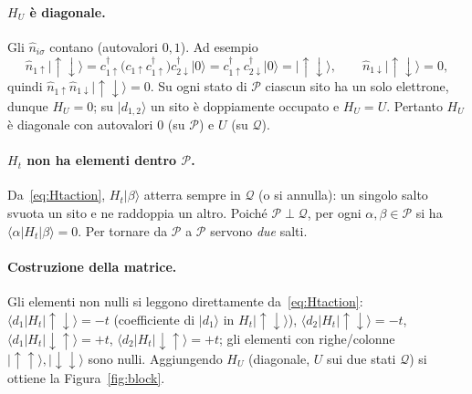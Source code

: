 \documentclass[11pt,a4paper]{article}
\newcommand{\ket}[1]{\lvert #1 \rangle}
\newcommand{\melem}[3]{\langle #1 \vert #2 \vert #3 \rangle}
\newcommand{\up}{\uparrow}
\newcommand{\dn}{\downarrow}
\newcommand{\dg}{\dagger}
\newcommand{\opn}{\hat{n}}
\theoremstyle{definition}
\theoremstyle{remark}
\begin{document}
\paragraph{$H_U$ è diagonale.} Gli $\opn_{i\sigma}$ contano (autovalori $0,1$). Ad esempio
\[
\opn_{1\up}\ket{\up\dn}=c_{1\up}^{\dg}\big(c_{1\up}c_{1\up}^{\dg}\big)c_{2\dn}^{\dg}\ket{0}
=c_{1\up}^{\dg}c_{2\dn}^{\dg}\ket{0}=\ket{\up\dn},\qquad \opn_{1\dn}\ket{\up\dn}=0,
\]
quindi $\opn_{1\up}\opn_{1\dn}\ket{\up\dn}=0$. Su ogni stato di $\mathcal P$ ciascun sito ha un solo
elettrone, dunque $H_U=0$; su $\ket{d_{1,2}}$ un sito è doppiamente occupato e $H_U=U$. Pertanto $H_U$ è
diagonale con autovalori $0$ (su $\mathcal P$) e $U$ (su $\mathcal Q$).

\paragraph{$H_t$ non ha elementi dentro $\mathcal P$.} Da~\eqref{eq:Htaction}, $H_t\ket{\beta}$ atterra
sempre in $\mathcal Q$ (o si annulla): un singolo salto svuota un sito e ne raddoppia un altro. Poiché
$\mathcal P\perp\mathcal Q$, per ogni $\alpha,\beta\in\mathcal P$ si ha
$\melem{\alpha}{H_t}{\beta}=0$. Per tornare da $\mathcal P$ a $\mathcal P$ servono \emph{due} salti.

\paragraph{Costruzione della matrice.} Gli elementi non nulli si leggono direttamente
da~\eqref{eq:Htaction}: $\melem{d_1}{H_t}{\up\dn}=-t$ (coefficiente di $\ket{d_1}$ in $H_t\ket{\up\dn}$),
$\melem{d_2}{H_t}{\up\dn}=-t$, $\melem{d_1}{H_t}{\dn\up}=+t$, $\melem{d_2}{H_t}{\dn\up}=+t$; gli elementi
con righe/colonne $\ket{\up\up},\ket{\dn\dn}$ sono nulli. Aggiungendo $H_U$ (diagonale, $U$ sui due stati
$\mathcal Q$) si ottiene la Figura~\ref{fig:block}.
\end{document}
